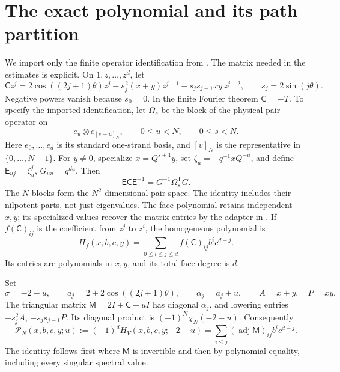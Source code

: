 \documentclass[11pt]{article}
\numberwithin{equation}{section}
\theoremstyle{remark}\newtheorem{remark}[theorem]{Remark}
\begin{document}
\section{The exact polynomial and its path partition}\label{lc:source}
We import only the finite operator identification from \cite{FinitePaper}.
The matrix needed in the estimates is explicit. On \(1,z,\ldots,z^d\),
let
\begin{equation}\label{lc:banded}
 \mathsf C z^j=2\cos((2j+1)\theta)z^j
       -s_j^2(x+y)z^{j-1}-s_js_{j-1}xy\,z^{j-2},
 \qquad s_j=2\sin(j\theta).
\end{equation}
Negative powers vanish because \(s_0=0\). In the finite Fourier theorem
\(\mathsf C=-T\). To specify the imported identification, let
\(\Omega_s\) be the block of the physical pair operator on
\[
 e_u\otimes e_{[s-u]_N},\qquad 0\le u<N,\qquad 0\le s<N.
\]
Here \(e_0,\ldots,e_d\) is its standard one-strand basis, and
\([v]_N\) is the representative in \(\{0,\ldots,N-1\}\).
For \(y\ne0\), specialize \(x=Q^{s+1}y\), set
\(\zeta_u=-q^{-1}xQ^{-u}\), and define
\(\mathsf E_{uj}=\zeta_u^j\), \(G_{uu}=q^{du}\). Then
\begin{equation}\label{lc:residue-adapter}
 \mathsf E\mathsf C\mathsf E^{-1}
                     =G^{-1}\Omega_s^{\mathsf T}G.
\end{equation}
The \(N\) blocks form the \(N^2\)-dimensional pair space. The identity
includes their nilpotent parts, not just eigenvalues. The face
polynomial retains independent \(x,y\); its specialized values recover
the matrix entries by the adapter in \cite[equation (4.5)]{FinitePaper}.
If \(f(\mathsf C)_{ij}\) is the coefficient from \(z^j\)
to \(z^i\), the homogeneous polynomial is
\[
 H_f(x,b,c,y)=\sum_{0\le i\le j\le d}f(\mathsf C)_{ij}b^ic^{d-j}.
\]
Its entries are polynomials in \(x,y\), and its total face degree is \(d\).

Set
\begin{equation}\label{lc:diagonal}
 \sigma=-2-u,\qquad a_j=2+2\cos((2j+1)\theta),\qquad
 \alpha_j=a_j+u,\qquad A=x+y,\quad P=xy.
\end{equation}
The triangular matrix \(\mathsf M=2I+\mathsf C+uI\) has diagonal
\(\alpha_j\), and lowering entries \(-s_j^2A\), \(-s_js_{j-1}P\).
Its diagonal product is \((-1)^N\chi_N(-2-u)\). Consequently
\begin{equation}\label{lc:adjugate}
 \mathcal P_N(x,b,c,y;u):=(-1)^dH_V(x,b,c,y;-2-u)
       =\sum_{i\le j}(\operatorname{adj}\mathsf M)_{ij}b^ic^{d-j}.
\end{equation}
The identity follows first where \(\mathsf M\) is invertible and then
by polynomial equality, including every singular spectral value.
\end{document}
